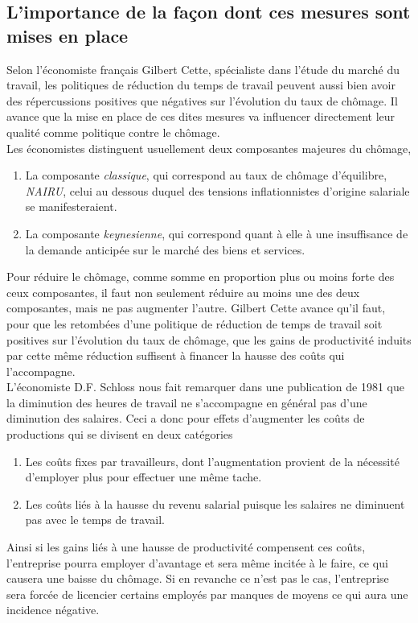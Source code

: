 \documentclass[main.tex]{subfiles}
\begin{document}
        \subsection{L'importance de la façon dont ces mesures sont mises en place}

        Selon l'économiste français Gilbert Cette, spécialiste dans l'étude du marché du travail, les politiques de réduction du temps de travail peuvent aussi bien avoir des répercussions positives que négatives sur l'évolution du taux de chômage. Il avance que la mise en place de ces dites mesures va influencer directement leur qualité comme politique contre le chômage. \\

        Les économistes distinguent usuellement deux composantes majeures du chômage,
        \begin{enumerate}
                \item La composante \emph{classique}, qui correspond au taux de chômage d'équilibre, \emph{NAIRU}, celui au dessous duquel des tensions inflationnistes d'origine salariale se manifesteraient.
                \item La composante \emph{keynesienne}, qui correspond quant à elle à une insuffisance de la demande anticipée sur le marché des biens et services.
        \end{enumerate}

        Pour réduire le chômage, comme somme en proportion plus ou moins forte des ceux composantes, il faut non seulement réduire au moins une des deux composantes, mais ne pas augmenter l'autre. Gilbert Cette avance qu'il faut, pour que les retombées d'une politique de réduction de temps de travail soit positives sur l'évolution du taux de chômage, que les gains de productivité induits par cette même réduction suffisent à financer la hausse des coûts qui l'accompagne. \\

        L'économiste D.F. Schloss nous fait remarquer dans une publication de 1981 que la diminution des heures de travail ne s'accompagne en général pas d'une diminution des salaires. Ceci a donc pour effets d'augmenter les coûts de productions qui se divisent en deux catégories 
        \begin{enumerate}
                \item Les coûts fixes par travailleurs, dont l'augmentation provient de la nécessité d'employer plus pour effectuer une même tache.
                \item Les coûts liés à la hausse du revenu salarial puisque les salaires ne diminuent pas avec le temps de travail.
        \end{enumerate}
        Ainsi si les gains liés à une hausse de productivité compensent ces coûts, l'entreprise pourra employer d'avantage et sera même incitée à le faire, ce qui causera une baisse du chômage. Si en revanche ce n'est pas le cas, l'entreprise sera forcée de licencier certains employés par manques de moyens ce qui aura une incidence négative. \\
\end{document}
